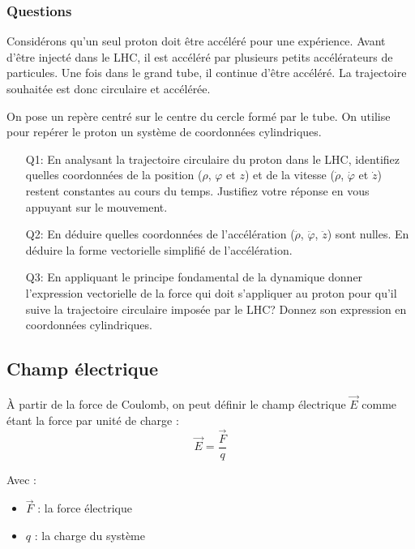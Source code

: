 \documentclass[14pt]{article}
\begin{document}
\subsubsection{Questions}

Considérons qu'un seul proton doit être accéléré pour une expérience. Avant d'être injecté dans le LHC, il est accéléré par plusieurs petits accélérateurs de particules. Une fois dans le grand tube, il continue d'être accéléré. La trajectoire souhaitée est donc circulaire et accélérée.

On pose un repère centré sur le centre du cercle formé par le tube. On utilise pour repérer le proton un système de coordonnées cylindriques.

\begin{enumerate}
    \item[Q1:] En analysant la trajectoire circulaire du proton dans le LHC, identifiez quelles coordonnées de la position ($\rho$, $\varphi$ et $z$) et de la vitesse ($\dot{\rho}$, $\dot{\varphi}$ et $\dot{z}$) restent constantes au cours du temps. Justifiez votre réponse en vous appuyant sur le mouvement.
    \item[Q2:] En déduire quelles coordonnées de l'accélération  ($\ddot{\rho}$, $\ddot{\varphi}$, $\ddot{z}$) sont nulles. En déduire la forme vectorielle simplifié de l'accélération.
    \item[Q3:] En appliquant le principe fondamental de la dynamique donner l'expression vectorielle de la force qui doit s'appliquer au proton pour qu'il suive la trajectoire circulaire imposée par le LHC? Donnez son expression en coordonnées cylindriques.
\end{enumerate}

\subsection{Champ électrique}\label{champE}

À partir de la force de Coulomb, on peut définir le champ électrique $\vec{E}$ comme étant la force par unité de charge :
\begin{equation} \label{eq:1.2}
    \vec{E} = \frac{\vec{F}}{q}
    \tag{1.2.1}
\end{equation}

Avec :
\begin{itemize}
    \item $\vec{F}$ : la force électrique
    \item $q$ : la charge du système
\end{itemize}
\end{document}
